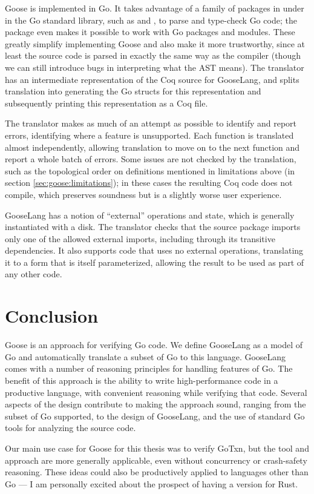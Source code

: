 Goose is implemented in Go. It takes advantage of a family of packages in under
 in the Go standard library, such as  and , to
parse and type-check Go code; the  package
even makes it possible to work with Go packages and modules. These greatly
simplify implementing Goose and also make it more trustworthy, since at least
the source code is parsed in exactly the same way as the compiler (though we can
still introduce bugs in interpreting what the AST means).
The translator has an intermediate representation of the Coq source for
GooseLang, and splits translation into generating the Go structs for this
representation and subsequently printing this representation as a Coq file.

The translator makes as much of an attempt as possible to identify and report
errors, identifying where a feature is unsupported. Each function is translated
almost independently, allowing translation to move on to the next function and
report a whole batch of errors. Some issues are not checked by the translation,
such as the topological order on definitions mentioned in limitations above (in
section \cref{sec:goose:limitations}); in these cases the resulting Coq code
does not compile, which preserves soundness but is a slightly worse user
experience.

GooseLang has a notion of ``external'' operations and state, which is generally
instantiated with a disk. The translator checks that the source package imports
only one of the allowed external imports, including through its transitive
dependencies. It also supports code that uses no external operations,
translating it to a form that is itself parameterized, allowing the result to be
used as part of any other code.

\section{Conclusion}

Goose is an approach for verifying Go code. We define GooseLang as a model of Go
and automatically translate a subset of Go to this language. GooseLang comes
with a number of reasoning principles for handling features of Go. The benefit
of this approach is the ability to write high-performance code in a
productive language, with convenient reasoning while verifying
that code. Several aspects of the design contribute to making the approach
sound, ranging from the subset of Go supported, to the design of GooseLang, and
the use of standard Go tools for analyzing the source code.

Our main use case for Goose for this thesis was to verify GoTxn, but
the tool and approach are more generally applicable, even without concurrency or
crash-safety reasoning. These ideas could also be productively applied to
languages other than Go --- I am personally excited about the prospect of having
a version for Rust.
